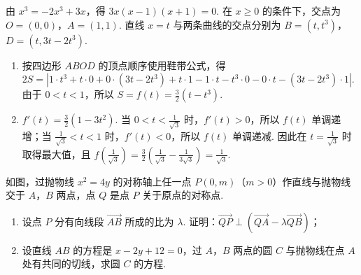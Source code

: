 \begin{solution}
由 \(x^3=-2x^3+3x\)，得 \(3x(x-1)(x+1)=0\). 在 \(x\geqslant0\) 的条件下，交点为 \(O=(0,0)\)，\(A=(1,1)\). 直线 \(x=t\) 与两条曲线的交点分别为
\(B=(t,t^3)\)，\(D=(t,3t-2t^3)\).

\begin{enumerate}
\item 按四边形 \(ABOD\) 的顶点顺序使用鞋带公式，得
\(\displaystyle 2S=\left|1\cdot t^3+t\cdot0+0\cdot(3t-2t^3)+t\cdot1-1\cdot t-t^3\cdot0-0\cdot t-(3t-2t^3)\cdot1\right|\).
由于 \(0<t<1\)，所以
\(\displaystyle S=f(t)=\frac{3}{2}(t-t^3)\).

\item \(\displaystyle f'(t)=\frac{3}{2}(1-3t^2)\). 当 \(0<t<\frac{1}{\sqrt{3}}\) 时，\(f'(t)>0\)，所以 \(f(t)\) 单调递增；当 \(\frac{1}{\sqrt{3}}<t<1\) 时，\(f'(t)<0\)，所以 \(f(t)\) 单调递减. 因此在 \(t=\frac{1}{\sqrt{3}}\) 时取得最大值，且
\(\displaystyle f\left(\frac{1}{\sqrt{3}}\right)=\frac{3}{2}\left(\frac{1}{\sqrt{3}}-\frac{1}{3\sqrt{3}}\right)=\frac{1}{\sqrt{3}}\).
\end{enumerate}
\end{solution}

\begin{problem}
如图，过抛物线 \(x^{2} = 4y\) 的对称轴上任一点 \(P(0, m)\)（\(m > 0\)）作直线与抛物线交于 \(A\)，\(B\) 两点，点 \(Q\) 是点 \(P\) 关于原点的对称点.

\begin{enumerate}
\item 设点 \(P\) 分有向线段 \(\overrightarrow{AB}\) 所成的比为 \(\lambda\). 证明：\(\overrightarrow{QP} \perp (\overrightarrow{QA} - \lambda \overrightarrow{QB})\)；
\item 设直线 \(AB\) 的方程是 \(x - 2y + 12 = 0\)，过 \(A\)，\(B\) 两点的圆 \(C\) 与抛物线在点 \(A\) 处有共同的切线，求圆 \(C\) 的方程.
\end{enumerate}

\end{problem}

